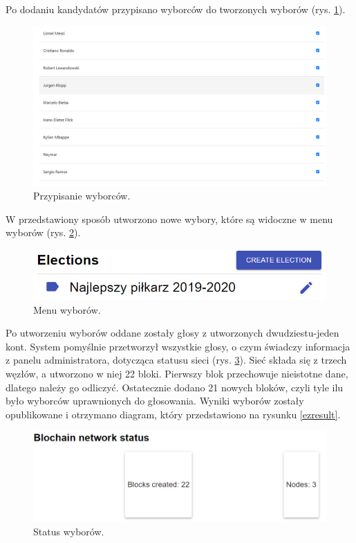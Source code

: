 \documentclass[a4paper,12pt]{book}
\begin{document}
Po dodaniu kandydatów przypisano wyborców do tworzonych wyborów (rys. \ref{choosingplayers}). 

\begin{figure}[H]
  \centering
\includegraphics[width=\textwidth]{images/choosingplayers.png}
\caption{Przypisanie wyborców.}\label{choosingplayers}
\end {figure}

W przedstawiony sposób utworzono nowe wybory, które są widoczne w menu wyborów (rys. \ref{addedelectionstest}).

\begin{figure}[H]
  \centering
\includegraphics[width=\textwidth]{images/addedelectionstest.png}
\caption{Menu wyborów.}\label{addedelectionstest}
\end {figure}

Po utworzeniu wyborów oddane zostały głosy z utworzonych dwudziestu-jeden kont. System pomyślnie przetworzył wszystkie głosy, o czym świadczy informacja z panelu administratora, dotycząca statusu sieci (rys. \ref{bcstatus2}).
Sieć składa się z trzech węzłów, a utworzono w niej 22 bloki. Pierwszy blok przechowuje nieistotne dane, dlatego należy go odliczyć.
Ostatecznie dodano 21 nowych bloków, czyli tyle ilu było wyborców uprawnionych do głosowania. Wyniki wyborów zostały opublikowane i otrzymano diagram, który przedstawiono na rysunku \ref{ezresult}.

\begin{figure}[H]
  \centering
\includegraphics[width=\textwidth]{images/bcstatus2.png}
\caption{Status wyborów.}\label{bcstatus2}
\end {figure}
\end{document}
